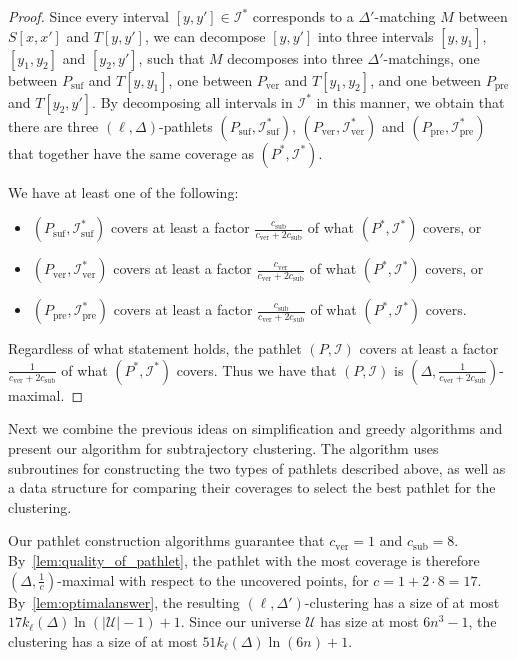 \documentclass[a4paper,UKenglish,cleveref,thm-restate,notab]{lipics-v2021}
\newcommand{\I}{\mathcal{I}}
\newcommand{\U}{\mathcal{U}}
\newcommand{\ver}{\mathrm{ver}}
\newcommand{\pre}{\mathrm{pre}}
\newcommand{\suf}{\mathrm{suf}}
\newcommand{\sub}{\mathrm{sub}}
\begin{document}
\begin{proof}
        Since every interval $[y, y'] \in \I^*$ corresponds to a $\Delta'$-matching $M$ between $S[x, x']$ and $T[y, y']$, we can decompose $[y, y']$ into three intervals $[y, y_1]$, $[y_1, y_2]$ and $[y_2, y']$, such that $M$ decomposes into three $\Delta'$-matchings, one between $P_\suf$ and $T[y, y_1]$, one between $P_\ver$ and $T[y_1, y_2]$, and one between $P_\pre$ and $T[y_2, y']$.
        By decomposing all intervals in $\I^*$ in this manner, we obtain that there are three $(\ell, \Delta)$-pathlets $(P_\suf, \I^*_\suf)$, $(P_\ver, \I^*_\ver)$ and $(P_\pre, \I^*_\pre)$ that together have the same coverage as $(P^*, \I^*)$.

        We have at least one of the following:
        \begin{itemize}
            \item $(P_\suf, \I^*_\suf)$ covers at least a factor $\frac{c_\sub}{c_\ver + 2c_\sub}$ of what $(P^*, \I^*)$ covers, or
            \item $(P_\ver, \I^*_\ver)$ covers at least a factor $\frac{c_\ver}{c_\ver + 2c_\sub}$ of what $(P^*, \I^*)$ covers, or
            \item $(P_\pre, \I^*_\pre)$ covers at least a factor $\frac{c_\sub}{c_\ver + 2c_\sub}$ of what $(P^*, \I^*)$ covers.
        \end{itemize}
        Regardless of what statement holds, the pathlet $(P, \I)$ covers at least a factor $\frac{1}{c_\ver + 2c_\sub}$ of what $(P^*, \I^*)$ covers.
        Thus we have that $(P, \I)$ is $(\Delta, \frac{1}{c_\ver + 2c_\sub})$-maximal.
    \end{proof}


    Next we combine the previous ideas on simplification and greedy algorithms and present our algorithm for subtrajectory clustering.
    The algorithm uses subroutines for constructing the two types of pathlets described above, as well as a data structure for comparing their coverages to select the best pathlet for the clustering.
    
    Our pathlet construction algorithms guarantee that $c_\ver = 1$ and $c_\sub = 8$.
    By~\cref{lem:quality_of_pathlet}, the pathlet with the most coverage is therefore $(\Delta, \frac{1}{c})$-maximal with respect to the uncovered points, for $c = 1 + 2 \cdot 8 = 17$.
    By~\cref{lem:optimalanswer}, the resulting $(\ell, \Delta')$-clustering has a size of at most $17k_\ell(\Delta) \ln (|\U|-1) + 1$.
    Since our universe $\U$ has size at most $6n^3-1$, the clustering has a size of at most $51k_\ell(\Delta) \ln (6n) + 1$.
\end{document}
